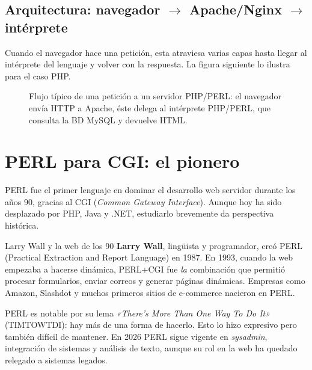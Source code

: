 \documentclass[11pt,a4paper,openany]{book}
\begin{document}
\subsection{Arquitectura: navegador $\to$ Apache/Nginx $\to$ intérprete}

Cuando el navegador hace una petición, esta atraviesa varias
capas hasta llegar al intérprete del lenguaje y volver con la
respuesta. La figura siguiente lo ilustra para el caso PHP.


\begin{figure}[htbp]
\centering
{}
\caption{Flujo típico de una petición a un servidor PHP/PERL: el
navegador envía HTTP a Apache, éste delega al intérprete PHP/PERL,
que consulta la BD MySQL y devuelve HTML.}
\end{figure}

\section{PERL para CGI: el pionero}

PERL fue el primer lenguaje en dominar el desarrollo web
servidor durante los años 90, gracias al CGI (\emph{Common Gateway
Interface}). Aunque hoy ha sido desplazado por PHP, Java y .NET,
estudiarlo brevemente da perspectiva histórica.


\begin{cajahistoria}{Larry Wall y la web de los 90}
\textbf{Larry Wall}, lingüista y programador, creó PERL (Practical
Extraction and Report Language) en 1987. En 1993, cuando la web
empezaba a hacerse dinámica, PERL+CGI fue \emph{la} combinación que
permitió procesar formularios, enviar correos y generar páginas
dinámicas. Empresas como Amazon, Slashdot y muchos primeros sitios
de e-commerce nacieron en PERL.

PERL es notable por su lema \emph{«There's More Than One Way To Do
It»} (TIMTOWTDI): hay más de una forma de hacerlo. Esto lo hizo
expresivo pero también difícil de mantener. En 2026 PERL sigue
vigente en \emph{sysadmin}, integración de sistemas y análisis de
texto, aunque su rol en la web ha quedado relegado a sistemas
legados.
\end{cajahistoria}
\end{document}
